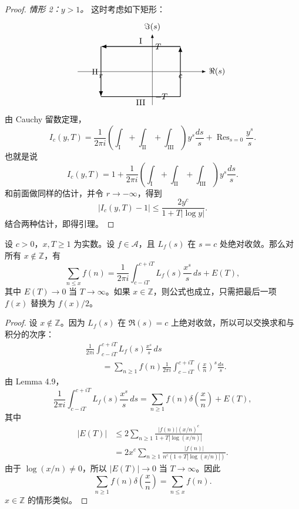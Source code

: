 \begin{proof}
	\emph{情形 2：$y>1$。} 这时考虑如下矩形：
	\[
	\begin{tikzpicture}[baseline={(current bounding box.center)}, >=Latex, x=1cm, y=0.9cm]
		\draw[->] (-3.2,0) -- (2.3,0) node[right] {$\Re(s)$};
		\draw[->] (0,-1.6) -- (0,1.8) node[above] {$\Im(s)$};
		\draw[thick, ->] (1.2,-1.2) -- (1.2,1.2);
		\draw[thick, ->] (1.2,1.2) -- (-2.2,1.2);
		\draw[thick, ->] (-2.2,1.2) -- (-2.2,-1.2);
		\draw[thick] (-2.2,-1.2) -- (1.2,-1.2);
		\node[below] at (1.2,0) {$c$};
		\node[below] at (-2.2,0) {$r$};
		\node[right] at (0,1.2) {$T$};
		\node[right] at (0,-1.2) {$-T$};
		\node[above] at (-0.5,1.2) {I};
		\node[left] at (-2.2,0) {II};
		\node[below] at (-0.5,-1.2) {III};
	\end{tikzpicture}
	\]
	由 Cauchy 留数定理，
	\[
		I_c(y,T)
		=
		\frac1{2\pi i}
		\left(
		\int_{\mathrm I}
		+
		\int_{\mathrm{II}}
		+
		\int_{\mathrm{III}}
		\right)y^s\frac{ds}{s}
		+
		\operatorname{Res}_{s=0}\frac{y^s}{s}.
	\]
	也就是说
	\[
		I_c(y,T)
		=
		1+
		\frac1{2\pi i}
		\left(
		\int_{\mathrm I}
		+
		\int_{\mathrm{II}}
		+
		\int_{\mathrm{III}}
		\right)y^s\frac{ds}{s}.
	\]
	和前面做同样的估计，并令 $r\to-\infty$，得到
	\[
		|I_c(y,T)-1|
		\leq
		\frac{2y^c}{1+T|\log y|}.
	\]
	结合两种估计，即得引理。
\end{proof}

\begin{theorem}
	设 $c>0$，$x,T\geq 1$ 为实数。设 $f\in\mathcal A$，且 $L_f(s)$ 在 $s=c$ 处绝对收敛。那么对所有 $x\notin\mathbb Z$，有
	\[
		\sum_{n\leq x}f(n)
		=
		\frac1{2\pi i}\int_{c-iT}^{c+iT}
		L_f(s)\frac{x^s}{s}\,ds
		+
		E(T),
	\]
	其中 $E(T)\to 0$ 当 $T\to\infty$。如果 $x\in\mathbb Z$，则公式也成立，只需把最后一项 $f(x)$ 替换为 $f(x)/2$。
\end{theorem}

\begin{proof}
	设 $x\notin\mathbb Z$。因为 $L_f(s)$ 在 $\Re(s)=c$ 上绝对收敛，所以可以交换求和与积分的次序：
	\[
	\begin{aligned}
		&\frac1{2\pi i}\int_{c-iT}^{c+iT}
		L_f(s)\frac{x^s}{s}\,ds\\
		&\qquad=
		\sum_{n\geq 1}f(n)
		\frac1{2\pi i}
		\int_{c-iT}^{c+iT}\left(\frac{x}{n}\right)^s\frac{ds}{s}.
	\end{aligned}
	\]
	由 Lemma 4.9，
	\[
		\frac1{2\pi i}\int_{c-iT}^{c+iT}
		L_f(s)\frac{x^s}{s}\,ds
		=
		\sum_{n\geq 1}f(n)\delta\left(\frac{x}{n}\right)
		+
		E(T),
	\]
	其中
	\[
	\begin{aligned}
		|E(T)|
		&\leq
		2\sum_{n\geq 1}
		\frac{|f(n)|(x/n)^c}
		{1+T|\log(x/n)|}\\
		&=
		2x^c\sum_{n\geq 1}
		\frac{|f(n)|}{n^c(1+T|\log(x/n)|)}.
	\end{aligned}
	\]
	由于 $\log(x/n)\neq 0$，所以 $|E(T)|\to 0$ 当 $T\to\infty$。因此
	\[
		\sum_{n\geq 1}f(n)\delta\left(\frac{x}{n}\right)
		=
		\sum_{n\leq x}f(n).
	\]
	$x\in\mathbb Z$ 的情形类似。
\end{proof}

